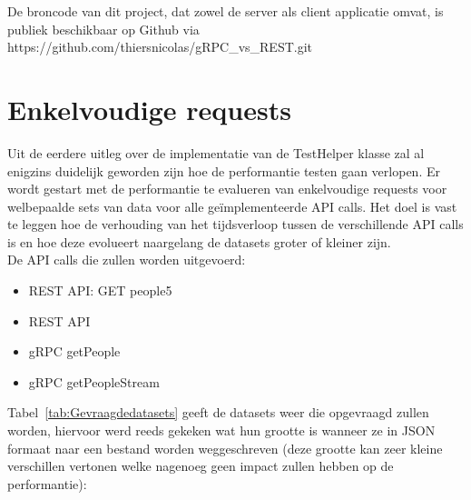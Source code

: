 De broncode van dit project, dat zowel de server als client applicatie omvat, is publiek beschikbaar op Github via https://github.com/thiersnicolas/gRPC\_vs\_REST.git

\section{Enkelvoudige requests}

Uit de eerdere uitleg over de implementatie van de TestHelper klasse zal al enigzins duidelijk geworden zijn hoe de performantie testen gaan verlopen.
Er wordt gestart met de performantie te evalueren van enkelvoudige requests voor welbepaalde sets van data voor alle geïmplementeerde API calls.
Het doel is vast te leggen hoe de verhouding van het tijdsverloop tussen de verschillende API calls is en hoe deze evolueert naargelang de
datasets groter of kleiner zijn.\\

De API calls die zullen worden uitgevoerd:
\begin{itemize}
    \item REST API: GET people5
    \item REST API
    \item gRPC getPeople
    \item gRPC getPeopleStream
\end{itemize}

Tabel~\ref{tab:Gevraagdedatasets} geeft de datasets weer die opgevraagd zullen worden, hiervoor werd reeds gekeken wat hun grootte is
wanneer ze in JSON formaat naar een bestand worden weggeschreven (deze grootte kan zeer kleine verschillen vertonen welke nagenoeg geen impact zullen hebben op de performantie):\\

